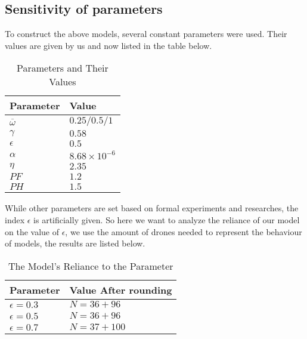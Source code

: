 \documentclass[13pt]{ctexart} %
\begin{document}
\subsection{Sensitivity of parameters}
To construct the above models, several constant parameters were used. Their values are given by us and now listed in the table below.
\begin{table}[h]\label{paratab}
    \centering
    \caption{Parameters and Their Values}
    \vspace{3pt}
    \begin{tabular}{>{\centering\arraybackslash}p{6em}>{\centering\arraybackslash}p{30em}}
        \toprule %
        Parameter           & Value                \\
        \midrule %
        $\overline{\omega}$ & $0.25/ 0.5/ 1$       \\
        $\gamma$            & $0.58$               \\
        $\epsilon$          & $0.5$                \\
        $\alpha$            & $8.68\times 10^{-6}$ \\
        $\eta$              & $2.35$               \\
        $PF$                & $1.2$                \\
        $PH$                & $1.5$                \\
        \bottomrule %
    \end{tabular}
\end{table}

While other parameters are set based on formal experiments and researches, the index $\epsilon$ is artificially given. So here we want to analyze the reliance of our model on the value of $\epsilon$, we use the amount of drones needed to represent the behaviour of models, the results are listed below.

\begin{table}[h]
    \centering
    \caption{The Model's Reliance to the Parameter}
    \vspace{3pt}
    \begin{tabular}{>{\centering\arraybackslash}p{6em}>{\centering\arraybackslash}p{30em}}
        \toprule %
        Parameter      & Value{\small
        After rounding}               \\
        \midrule %
        $\epsilon=0.3$ & $N=36+96$    \\
        $\epsilon=0.5$ & $N=36+96$    \\
        $\epsilon=0.7$ & $N=37+100$   \\
        \bottomrule %
    \end{tabular}
\end{table}
\end{document}
